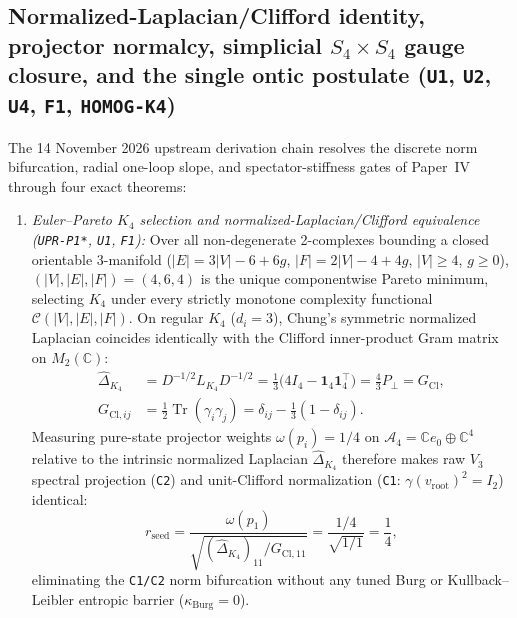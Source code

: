 \documentclass[11pt]{article}
\newcommand{\Tr}{\operatorname{Tr}}
\begin{document}
\subsection{Normalized-Laplacian/Clifford identity, projector normalcy, simplicial \texorpdfstring{$S_4\times S_4$}{S4xS4} gauge closure, and the single ontic postulate (\texttt{U1}, \texttt{U2}, \texttt{U4}, \texttt{F1}, \texttt{HOMOG-K4})}
\label{sec:paperiv-u1-u4-f1-homogk4}
The 14 November 2026 upstream derivation chain resolves the discrete norm bifurcation, radial one-loop slope, and spectator-stiffness gates of Paper~IV through four exact theorems:
\begin{enumerate}
\item \emph{Euler--Pareto $K_4$ selection and normalized-Laplacian/Clifford equivalence (\texttt{UPR-P1*}, \texttt{U1}, \texttt{F1}):} Over all non-degenerate 2-complexes bounding a closed orientable 3-manifold ($|E|=3|V|-6+6g$, $|F|=2|V|-4+4g$, $|V|\ge 4$, $g\ge 0$), $(|V|,|E|,|F|)=(4,6,4)$ is the unique componentwise Pareto minimum, selecting $K_4$ under every strictly monotone complexity functional $\mathcal{C}(|V|,|E|,|F|)$. On regular $K_4$ ($d_i=3$), Chung's symmetric normalized Laplacian coincides identically with the Clifford inner-product Gram matrix on $M_2(\mathbb{C})$:
\begin{equation}
\begin{aligned}
  \widehat{\Delta}_{K_4} &= D^{-1/2}L_{K_4}D^{-1/2} = \frac{1}{3}\bigl(4I_4-\mathbf{1}_4\mathbf{1}_4^\top\bigr) = \frac{4}{3}P_\perp = G_{\mathrm{Cl}}, \\
  G_{\mathrm{Cl},ij} &= \frac{1}{2}\Tr(\gamma_i\gamma_j) = \delta_{ij}-\frac{1}{3}(1-\delta_{ij}).
\end{aligned}
\label{eq:paperiv-chung-clifford-identity}
\end{equation}
Measuring pure-state projector weights $\omega(p_i)=1/4$ on $\mathcal{A}_4=\mathbb{C}e_0\oplus\mathbb{C}^4$ relative to the intrinsic normalized Laplacian $\widehat{\Delta}_{K_4}$ therefore makes raw $V_3$ spectral projection (\texttt{C2}) and unit-Clifford normalization (\texttt{C1}: $\gamma(v_{\mathrm{root}})^2=I_2$) identical:
\begin{equation}
  \boxed{r_{\mathrm{seed}} = \frac{\omega(p_1)}{\sqrt{(\widehat{\Delta}_{K_4})_{11}/G_{\mathrm{Cl},11}}} = \frac{1/4}{\sqrt{1/1}} = \frac{1}{4},}
  \label{eq:paperiv-rseed-exact}
\end{equation}
eliminating the \texttt{C1/C2} norm bifurcation without any tuned Burg or Kullback--Leibler entropic barrier ($\kappa_{\mathrm{Burg}}=0$).

\end{enumerate}
\end{document}
